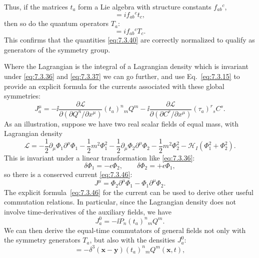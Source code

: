 Thus, if the matrices $t_a$ form a Lie algebra with structure constants
$f_{ab}{}^c$,
\begin{equation}
[t_a,t_b] =if_{ab}{}^ct_c,
\tag{7.3.44}\label{eq:7.3.44}
\end{equation}
then so do the quantum operators $T_a$:
\begin{equation}
[T_a,T_b] =if_{ab}{}^cT_c.
\tag{7.3.45}\label{eq:7.3.45}
\end{equation}
This confirms that the quantities \eqref{eq:7.3.40} are correctly normalized to qualify
as generators of the symmetry group.

Where the Lagrangian is the integral of a Lagrangian density which is invariant
under \eqref{eq:7.3.36} and \eqref{eq:7.3.37} we can go further, and use Eq.~\eqref{eq:7.3.15} to provide
an explicit formula for the currents associated with these global symmetries:
\begin{equation}
J_a^\mu=-\ii\frac{\partial\mathcal{L}}
{\partial(\partial Q^n/\partial x^\mu)}(t_a)^n{}_mQ^m
-\ii\frac{\partial\mathcal{L}}
{\partial(\partial C^r/\partial x^\mu)}(\tau_a)^r{}_sC^s.
\tag{7.3.46}\label{eq:7.3.46}
\end{equation}
As an illustration, suppose we have two real scalar fields of equal mass, with
Lagrangian density
\begin{equation}
\mathcal{L}=-\frac12\partial_\mu\Phi_1\partial^\mu\Phi_1
-\frac12m^2\Phi_1^2
-\frac12\partial_\mu\Phi_2\partial^\mu\Phi_2
-\frac12m^2\Phi_2^2-\mathcal{H}_I(\Phi_1^2+\Phi_2^2).
\tag{7.3.47}\label{eq:7.3.47}
\end{equation}
This is invariant under a linear transformation like \eqref{eq:7.3.36}:
\[
\delta\Phi_1=-\epsilon\Phi_2,
\qquad
\delta\Phi_2=+\epsilon\Phi_1,
\]
so there is a conserved current \eqref{eq:7.3.46}:
\[
J^\mu=\Phi_2\partial^\mu\Phi_1-\Phi_1\partial^\mu\Phi_2.
\]
The explicit formula~\eqref{eq:7.3.46} for the current can be used to derive other
useful commutation relations. In particular, since the Lagrangian density does
not involve time-derivatives of the auxiliary fields, we have
\begin{equation}
J_a^0=-\ii P_n(t_a)^n{}_mQ^m.
\tag{7.3.48}\label{eq:7.3.48}
\end{equation}
We can then derive the equal-time commutators of general fields not only with
the symmetry generators $T_a$, but also with the densities $J_a^0$:
\begin{equation}
[J_a^0(\mathbf{x},t),Q^n(\mathbf{y},t)]
=-\delta^3(\mathbf{x}-\mathbf{y})(t_a)^n{}_mQ^m(\mathbf{x},t),
\tag{7.3.49}\label{eq:7.3.49}
\end{equation}
